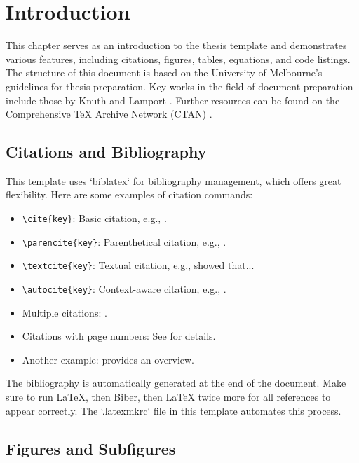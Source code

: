 \chapter{Introduction}
\label{ch:introduction}

This chapter serves as an introduction to the thesis template and demonstrates various features, including citations, figures, tables, equations, and code listings.
The structure of this document is based on the University of Melbourne's guidelines for thesis preparation.
Key works in the field of document preparation include those by Knuth \cite{Knuth1984} and Lamport \cite{Lamport1986}.
Further resources can be found on the Comprehensive TeX Archive Network (CTAN) \autocite{CTAN}.

\section{Citations and Bibliography}
\label{sec:citations}

This template uses `biblatex` for bibliography management, which offers great flexibility.
Here are some examples of citation commands:
\begin{itemize}
    \item \verb|\cite{key}|: Basic citation, e.g., \cite{Reference1}.
    \item \verb|\parencite{key}|: Parenthetical citation, e.g., \parencite{Reference2}.
    \item \verb|\textcite{key}|: Textual citation, e.g., \textcite{Reference3} showed that...
    \item \verb|\autocite{key}|: Context-aware citation, e.g., \autocite{Hao2023}.
    \item Multiple citations: \cite{Reference1, Reference2}.
    \item Citations with page numbers: See \cite[p.~15]{Knuth1984} for details.
    \item Another example: \textcite[see Chapter~3]{Lamport1986} provides an overview.
\end{itemize}
The bibliography is automatically generated at the end of the document. Make sure to run LaTeX, then Biber, then LaTeX twice more for all references to appear correctly. The `.latexmkrc` file in this template automates this process.

\section{Figures and Subfigures}
\label{sec:figures}

